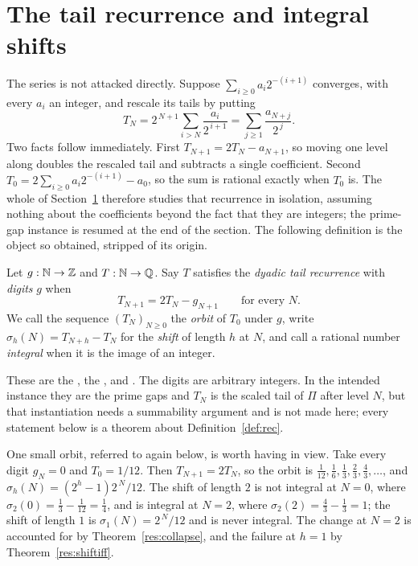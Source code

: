 \documentclass[11pt]{article}
\begin{document}
\section{The tail recurrence and integral shifts}\label{sec:tail}

The series is not attacked directly.  Suppose $\sum_{i\ge0}a_i2^{-(i+1)}$
converges, with every $a_i$ an integer, and rescale its tails by putting
\[
 T_N=2^{\,N+1}\sum_{i>N}\frac{a_i}{2^{\,i+1}}
    =\sum_{j\ge1}\frac{a_{N+j}}{2^{\,j}} .
\]
Two facts follow immediately.  First $T_{N+1}=2T_N-a_{N+1}$, so moving one
level along doubles the rescaled tail and subtracts a single coefficient.
Second $T_0=2\sum_{i\ge0}a_i2^{-(i+1)}-a_0$, so the sum is rational exactly
when $T_0$ is.  The whole of Section~\ref{sec:tail} therefore studies that
recurrence in isolation, assuming nothing about the coefficients beyond the
fact that they are integers; the prime-gap instance is resumed at the end of
the section.  The following definition is the object so obtained, stripped of
its origin.

\begin{definition}\label{def:rec}
Let $g:\mathbb{N}\to\mathbb{Z}$ and $T:\mathbb{N}\to\mathbb{Q}$.  Say $T$ satisfies the \emph{dyadic tail
recurrence} with \emph{digits} $g$ when
\[
 T_{N+1}=2T_N-g_{N+1}\qquad\text{for every }N .
\]
We call the sequence $(T_N)_{N\ge0}$ the \emph{orbit} of $T_0$ under $g$,
write $\sigma_h(N)=T_{N+h}-T_N$ for the \emph{shift} of length $h$ at $N$, and
call a rational number \emph{integral} when it is the image of an integer.
\end{definition}

\noindent These are the
, the
, and
.
The digits are arbitrary integers.  In the intended instance they are the prime
gaps and $T_N$ is the scaled tail of $\Pi$ after level $N$, but that
instantiation needs a summability argument and is not made here; every
statement below is a theorem about Definition~\ref{def:rec}.

One small orbit, referred to again below, is worth having in view.  Take every
digit $g_N=0$ and $T_0=1/12$.  Then $T_{N+1}=2T_N$, so the orbit is
$\tfrac1{12},\tfrac16,\tfrac13,\tfrac23,\tfrac43,\ldots$, and
$\sigma_h(N)=(2^{h}-1)2^{\,N}/12$.  The shift of length $2$ is not integral at
$N=0$, where $\sigma_2(0)=\tfrac13-\tfrac1{12}=\tfrac14$, and is integral at
$N=2$, where $\sigma_2(2)=\tfrac43-\tfrac13=1$; the shift of length $1$ is
$\sigma_1(N)=2^{\,N}/12$ and is never integral.  The change at $N=2$ is
accounted for by Theorem~\ref{res:collapse}, and the failure at $h=1$ by
Theorem~\ref{res:shiftiff}.
\end{document}
